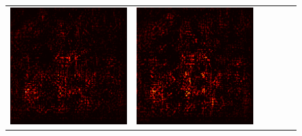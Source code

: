 \documentclass[preprint,12pt]{elsarticle}
\begin{document}
\begin{figure}[p]
\begin{tabular}{cccccc}
  \includegraphics[scale=\scale]{../visualizations/examples/imagenette/resnet18/active_saliency_map/0.png} & 
  \includegraphics[scale=\scale]{../visualizations/examples/imagenette/resnet18/inactive_saliency_map/0.png} \\
  

\end{tabular}
\end{figure}
\end{document}
